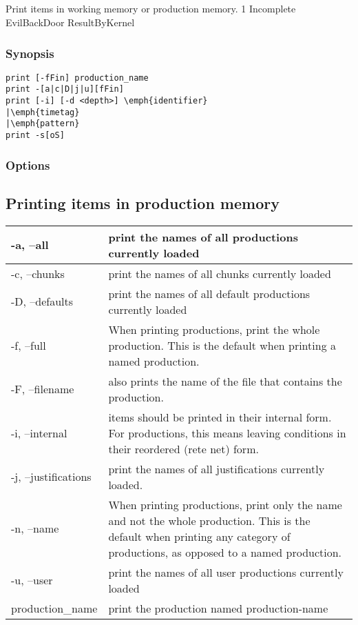 \subsection{}
\label{print}
Print items in working memory or production memory. 
 1 Incomplete EvilBackDoor ResultByKernel
\subsubsection*{Synopsis}
\begin{verbatim}
print [-fFin] production_name
print -[a|c|D|j|u][fFin]
print [-i] [-d <depth>] \emph{identifier}
|\emph{timetag}
|\emph{pattern}
print -s[oS]
\end{verbatim}
\subsubsection*{Options}
\subsection*{Printing items in production memory}
\begin{tabular}{|l|l|}
\hline 
 -a, --all  & print the names of all productions currently loaded  \\
 \hline 
 -c, --chunks  & print the names of all chunks currently loaded  \\
 \hline 
 -D, --defaults  & print the names of all default productions currently loaded  \\
 \hline 
 -f, --full  & When printing productions, print the whole production. This is the default when printing a named production.  \\
 \hline 
 -F, --filename  & also prints the name of the file that contains the production.  \\
 \hline 
 -i, --internal  & items should be printed in their internal form. For productions, this means leaving conditions in their reordered (rete net) form.  \\
 \hline 
 -j, --justifications  & print the names of all justifications currently loaded.  \\
 \hline 
 -n, --name  & When printing productions, print only the name and not the whole production. This is the default when printing any category of productions, as opposed to a named production.  \\
 \hline 
 -u, --user  & print the names of all user productions currently loaded  \\
 \hline 
production\_name & print the production named production-name \\
 \hline 
\end{tabular}
